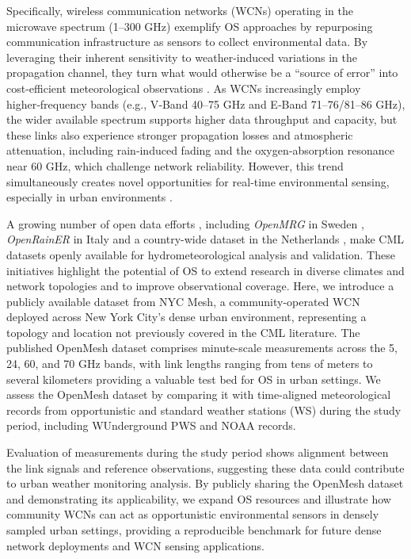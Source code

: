 \documentclass[manuscript]{copernicus}
\begin{document}
Specifically, wireless communication networks (WCNs) operating in the microwave spectrum (1–300 GHz) exemplify OS approaches by repurposing communication infrastructure as sensors to collect environmental data. By leveraging their inherent sensitivity to weather-induced variations in the propagation channel, they turn what would otherwise be a “source of error” into cost-efficient meteorological observations \citep{messer2006environmental}.
As WCNs increasingly employ higher‑frequency bands (e.g., V‑Band 40–75 GHz and E‑Band 71–76/81–86 GHz), the wider available spectrum supports higher data throughput and capacity, but these links also experience stronger propagation losses and atmospheric attenuation, including rain‑induced fading and the oxygen‑absorption resonance near 60 GHz, which challenge network reliability. However, this trend simultaneously creates novel opportunities for real‑time environmental sensing, especially in urban environments \citep{janco2023city}.

A growing number of open data efforts \citep{fencl2023data,fencl2025new}, including \emph{OpenMRG} in Sweden \citep{andersson2022openmrg}, \emph{OpenRainER} in Italy \citep{Covi_Roversi_2024} and a country-wide dataset in the Netherlands \citep{overeem2023commercial}, make CML datasets openly available for hydrometeorological analysis and validation. 
These initiatives highlight the potential of OS to extend research in diverse climates and network topologies and to improve observational coverage.
Here, we introduce a publicly available dataset from NYC Mesh, a community-operated WCN deployed across New York City's dense urban environment, representing a topology and location not previously covered in the CML literature.
The published OpenMesh dataset comprises minute-scale measurements across the 5, 24, 60, and 70 GHz bands, with link lengths ranging from tens of meters to several kilometers providing a valuable test bed for OS in urban settings. 
We assess the OpenMesh dataset by comparing it with time-aligned meteorological records from opportunistic and standard weather stations (WS) during the study period, including WUnderground PWS and NOAA records. 

Evaluation of measurements during the study period shows alignment between the link signals and reference observations, suggesting these data could contribute to urban weather monitoring analysis.
By publicly sharing the OpenMesh dataset and demonstrating its applicability, we expand OS resources and illustrate how community WCNs can act as opportunistic environmental sensors in densely sampled urban settings, providing a reproducible benchmark for future dense network deployments and WCN sensing applications.
\noindent
\end{document}
